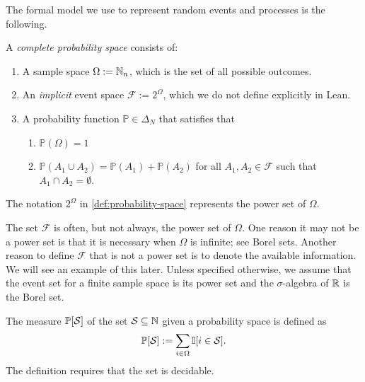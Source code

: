 The formal model we use to represent random events and processes is the following.
\begin{definition} \label{def:probability-space}
  A \emph{complete probability space} consists of:
  \begin{enumerate}
  \item A sample space $\Omega := \mathbb{N}_n$, which is the set of all possible outcomes. 
  \item An \emph{implicit} event space $\mathcal{F} := 2^{\Omega}$, which we do not define explicitly in Lean. 
  \item A probability function $\mathbb{P} \in \Delta_N$ that satisfies that
  \begin{enumerate}
  \item $\mathbb{P}(\Omega) = 1$
  \item $\mathbb{P}(A_1 \cup A_2) = \mathbb{P}(A_1) + \mathbb{P}(A_2)$ for all $A_1, A_2\in \mathcal{F}$ such that $A_1 \cap A_2 = \emptyset$.
  \end{enumerate}
  \end{enumerate}
\end{definition}
The notation $2^{\Omega}$ in \cref{def:probability-space} represents the power set of $\Omega$.

The set $\mathcal{F}$ is often, but not always, the power set of $\Omega$. One reason it may not be a power set is that it is necessary when $\Omega$ is infinite; see Borel sets. Another reason to define $\mathcal{F}$ that is not a power set is to denote the available information. We will see an example of this later. Unless specified otherwise, we assume that the event set for a finite sample space is its power set and the $\sigma$-algebra of $\mathbb{R}$ is the Borel set.

\begin{definition}[Measure]
  The measure $\mathbb{P} [\mathcal{S}]$ of the set $\mathcal{S} \subseteq \mathbb{N}$ given a probability space is defined as
  \[
   \mathbb{P} [\mathcal{S}] := \sum_{i \in \Omega} \mathbb{I}[ i\in \mathcal{S} ].
 \]
 The definition requires that the set is decidable. 
\end{definition}


